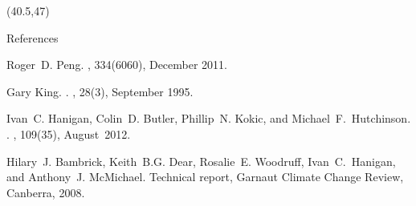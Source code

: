 \documentclass[final]{beamer}
\begin{document}
\begin{frame}{}
\begin{textblock}{17}(40.5,47)

\begin{block}{References}
\begin{tiny}
\begin{thebibliography}{1}

Roger~D. Peng.
, 334(6060), December 2011.

Gary King.
.
, 28(3), September 1995.

Ivan~C. Hanigan, Colin~D. Butler, Phillip~N. Kokic, and Michael~F.~Hutchinson.
.
, 109(35), August~2012.

Hilary~J. Bambrick, Keith~B.G. Dear, Rosalie~E. Woodruff, Ivan~C.~Hanigan, and
  Anthony~J. McMichael.
\newblock Technical report, Garnaut Climate Change Review, Canberra, 2008.

\end{thebibliography}
\end{tiny}
\end{block}


\end{textblock}
\end{frame}
\end{document}
